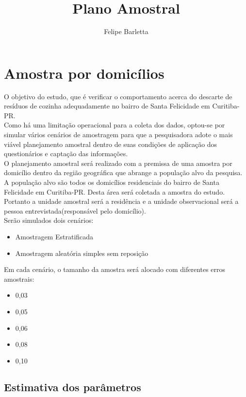 \documentclass[12pt]{article}\usepackage[]{graphicx}\usepackage[]{color}
\title{\textbf{Plano Amostral}}
\author{Felipe Barletta}
\begin{document}
\onehalfspacing
\maketitle
\indent



\section{Amostra por domicílios}

\indent

O objetivo do estudo, que é verificar o comportamento acerca do descarte
de resíduos de cozinha adequadamente no bairro de Santa Felicidade em
Curitiba-PR.\\
\indent
Como há uma limitação operacional para a coleta dos dados, optou-se por
simular vários cenários de amostragem para que a pesquisadora adote o mais
viável planejamento amostral dentro de suas condições de aplicação dos
questionários e captação das informações.\\
\indent
O planejamento amostral será realizado com a premissa de uma
amostra por domicílio dentro da região geográfica que abrange a população
alvo da pesquisa.\\
\indent
A população alvo são todos os domicílios residenciais do bairro de Santa
Felicidade em Curitiba-PR. Desta área será coletada a amostra do estudo.\\
\indent
Portanto a unidade amostral será a residência e
a unidade observacional será a pessoa entrevistada(responsável pelo domicílio). \\
\indent
Serão simulados dois cenários:
\begin{itemize}
  \item Amostragem Estratificada
  \item Amostragem aleatória simples sem reposição
\end{itemize}

Em cada cenário, o tamanho da amostra será alocado com diferentes erros amostrais:
\begin{itemize}
  \item 0,03
  \item 0,05
  \item 0,06
  \item 0,08
  \item 0,10
\end{itemize}

\subsection{Estimativa dos parâmetros}
\indent
\end{document}
